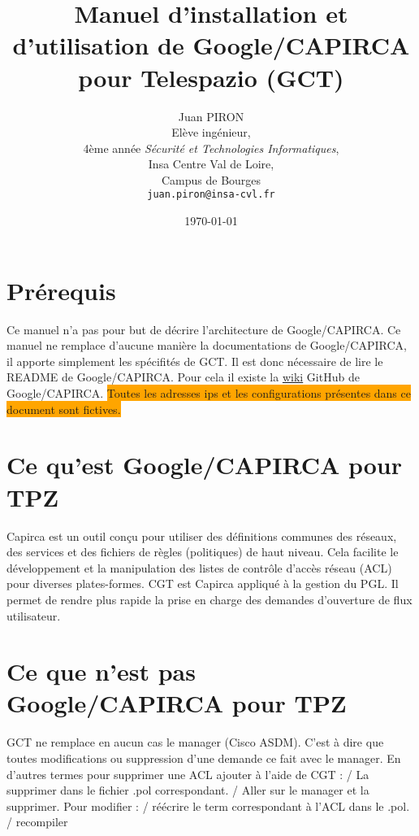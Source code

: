 \documentclass{article}
\title{Manuel d'installation et d'utilisation de Google/CAPIRCA pour Telespazio (GCT)}
\author{Juan PIRON\\
   Elève ingénieur,\\
   4ème année \textit{Sécurité et Technologies Informatiques},\\
   {\color{red} Insa Centre Val de Loire},\\
   {\color{green} Campus de Bourges}\\
   \texttt{juan.piron@insa-cvl.fr}
}
\date{\today}
\begin{document}
  \maketitle

  \newpage
  \tableofcontents
  \newpage

  \section{Prérequis}

    Ce manuel n'a pas pour but de décrire l'architecture de Google/CAPIRCA.
    Ce manuel ne remplace d'aucune manière la documentations de Google/CAPIRCA, il apporte simplement les spécifités de GCT.
    Il est donc nécessaire de lire le README de Google/CAPIRCA.
    Pour cela il existe la \href{https://github.com/google/capirca/wiki}{wiki} GitHub de Google/CAPIRCA.\smallbreak
    \noindent\colorbox{orange}{Toutes les adresses ips et les configurations présentes dans ce document sont fictives.}

  \section{Ce qu'est Google/CAPIRCA pour TPZ}

    Capirca est un outil conçu pour utiliser des définitions communes des réseaux, des services et des fichiers de règles (politiques) de haut niveau.
    Cela facilite le développement et la manipulation des listes de contrôle d'accès réseau (ACL) pour diverses plates-formes.
    CGT est Capirca appliqué à la gestion du PGL. Il permet de rendre plus rapide la prise en charge des demandes d'ouverture de flux utilisateur.
    \smallbreak

  \section{Ce que n'est pas Google/CAPIRCA pour TPZ}

    GCT ne remplace en aucun cas le manager (Cisco ASDM). C'est à dire que toutes modifications ou suppression d'une demande ce fait avec le manager.
    En d'autres termes pour supprimer une ACL ajouter à l'aide de CGT : / La supprimer dans le fichier .pol correspondant. / Aller sur le manager et la supprimer. \bigbreak
    \noindent Pour modifier : / réécrire le term correspondant à l'ACL dans le .pol. / recompiler \smallbreak
\end{document}

